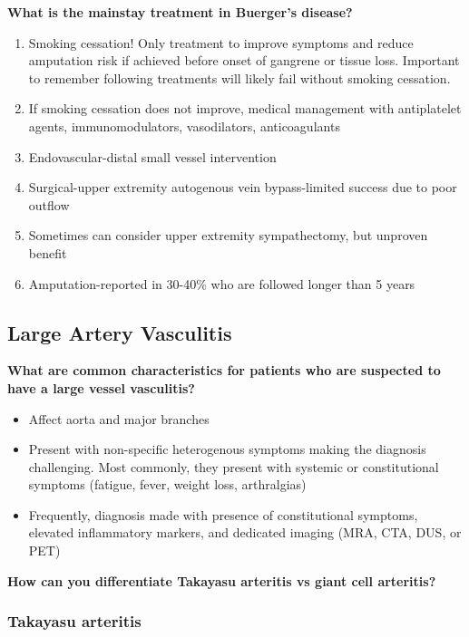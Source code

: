 \documentclass[
]{book}
\begin{document}
\textbf{What is the mainstay treatment in Buerger's disease?}

\begin{enumerate}
\def\labelenumi{\arabic{enumi}.}
\item
  Smoking cessation! Only treatment to improve symptoms and reduce
  amputation risk if achieved before onset of gangrene or tissue loss.
  Important to remember following treatments will likely fail without
  smoking cessation.
\item
  If smoking cessation does not improve, medical management with
  antiplatelet agents, immunomodulators, vasodilators, anticoagulants
\item
  Endovascular-distal small vessel intervention
\item
  Surgical-upper extremity autogenous vein bypass-limited success due
  to poor outflow
\item
  Sometimes can consider upper extremity sympathectomy, but unproven
  benefit
\item
  Amputation-reported in 30-40\% who are followed longer than 5
  years\citep{olin2018}
\end{enumerate}

\hypertarget{large-vasculitis}{%
\subsection{Large Artery Vasculitis}\label{large-vasculitis}}

\textbf{What are common characteristics for patients who are suspected to have
a large vessel vasculitis?} \citep{shanmugam137VasculitisOther2019, weyand2003}

\begin{itemize}
\item
  Affect aorta and major branches
\item
  Present with non-specific heterogenous symptoms making the diagnosis
  challenging. Most commonly, they present with systemic or
  constitutional symptoms (fatigue, fever, weight loss, arthralgias)
\item
  Frequently, diagnosis made with presence of constitutional symptoms,
  elevated inflammatory markers, and dedicated imaging (MRA, CTA, DUS,
  or PET)
\end{itemize}

\textbf{How can you differentiate Takayasu arteritis vs giant cell
arteritis?}

\hypertarget{takayasu-arteritis}{%
\subsubsection{Takayasu arteritis}\label{takayasu-arteritis}}
\end{document}
